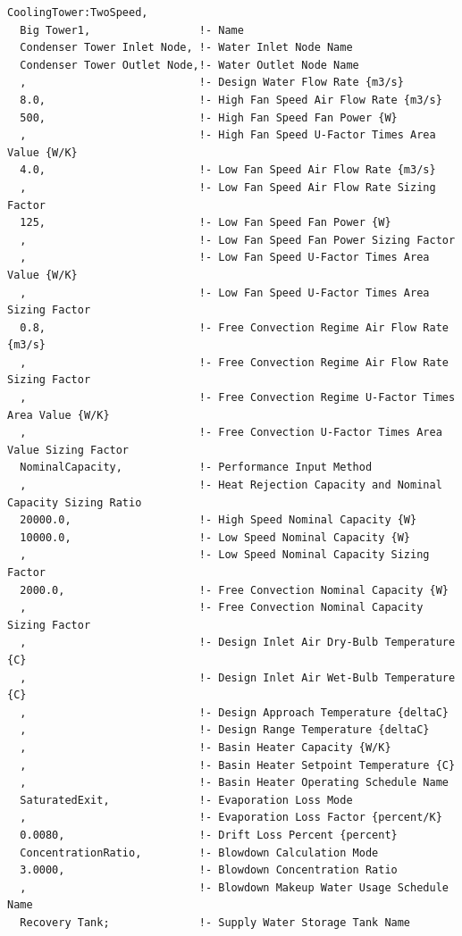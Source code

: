 \begin{lstlisting}
CoolingTower:TwoSpeed,
  Big Tower1,                 !- Name
  Condenser Tower Inlet Node, !- Water Inlet Node Name
  Condenser Tower Outlet Node,!- Water Outlet Node Name
  ,                           !- Design Water Flow Rate {m3/s}
  8.0,                        !- High Fan Speed Air Flow Rate {m3/s}
  500,                        !- High Fan Speed Fan Power {W}
  ,                           !- High Fan Speed U-Factor Times Area Value {W/K}
  4.0,                        !- Low Fan Speed Air Flow Rate {m3/s}
  ,                           !- Low Fan Speed Air Flow Rate Sizing Factor
  125,                        !- Low Fan Speed Fan Power {W}
  ,                           !- Low Fan Speed Fan Power Sizing Factor
  ,                           !- Low Fan Speed U-Factor Times Area Value {W/K}
  ,                           !- Low Fan Speed U-Factor Times Area Sizing Factor
  0.8,                        !- Free Convection Regime Air Flow Rate {m3/s}
  ,                           !- Free Convection Regime Air Flow Rate Sizing Factor
  ,                           !- Free Convection Regime U-Factor Times Area Value {W/K}
  ,                           !- Free Convection U-Factor Times Area Value Sizing Factor
  NominalCapacity,            !- Performance Input Method
  ,                           !- Heat Rejection Capacity and Nominal Capacity Sizing Ratio
  20000.0,                    !- High Speed Nominal Capacity {W}
  10000.0,                    !- Low Speed Nominal Capacity {W}
  ,                           !- Low Speed Nominal Capacity Sizing Factor
  2000.0,                     !- Free Convection Nominal Capacity {W}
  ,                           !- Free Convection Nominal Capacity Sizing Factor
  ,                           !- Design Inlet Air Dry-Bulb Temperature {C}
  ,                           !- Design Inlet Air Wet-Bulb Temperature {C}
  ,                           !- Design Approach Temperature {deltaC}
  ,                           !- Design Range Temperature {deltaC}
  ,                           !- Basin Heater Capacity {W/K}
  ,                           !- Basin Heater Setpoint Temperature {C}
  ,                           !- Basin Heater Operating Schedule Name
  SaturatedExit,              !- Evaporation Loss Mode
  ,                           !- Evaporation Loss Factor {percent/K}
  0.0080,                     !- Drift Loss Percent {percent}
  ConcentrationRatio,         !- Blowdown Calculation Mode
  3.0000,                     !- Blowdown Concentration Ratio
  ,                           !- Blowdown Makeup Water Usage Schedule Name
  Recovery Tank;              !- Supply Water Storage Tank Name


\end{lstlisting}
